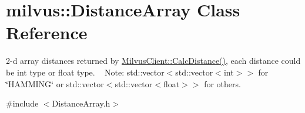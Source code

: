\hypertarget{classmilvus_1_1_distance_array}{}\section{milvus\+:\+:Distance\+Array Class Reference}
\label{classmilvus_1_1_distance_array}


2-\/d array distances returned by \hyperlink{classmilvus_1_1_milvus_client_a105c243c7d93ff2cd81b4d9c1751f5fb}{Milvus\+Client\+::\+Calc\+Distance()}, each distance could be int type or float type. ~\newline
Note\+: std\+::vector$<$std\+::vector$<$int$>$$>$ for \char`\"{}\+H\+A\+M\+M\+I\+N\+G\char`\"{} or std\+::vector$<$std\+::vector$<$float$>$$>$ for others.  




{\ttfamily \#include $<$Distance\+Array.\+h$>$}

